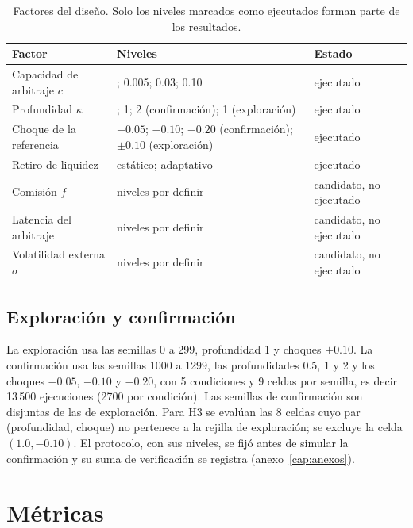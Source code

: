 \begin{table}[htbp]
\centering
\caption{Factores del diseño. Solo los niveles marcados como ejecutados forman parte de los resultados.}
\label{tab:factores}
\small
\begin{tabularx}{\textwidth}{@{}l >{\raggedright\arraybackslash}X l@{}}
\toprule
Factor & Niveles & Estado \\
\midrule
Capacidad de arbitraje $c$ & 0; 0.005; 0.03; 0.10 & ejecutado \\
Profundidad $\kappa$ & 0.5; 1; 2 (confirmación); 1 (exploración) & ejecutado \\
Choque de la referencia & $-0.05$; $-0.10$; $-0.20$ (confirmación); $\pm0.10$ (exploración) & ejecutado \\
Retiro de liquidez & estático; adaptativo & ejecutado \\
Comisión $f$ & niveles por definir & candidato, no ejecutado \\
Latencia del arbitraje & niveles por definir & candidato, no ejecutado \\
Volatilidad externa $\sigma$ & niveles por definir & candidato, no ejecutado \\
\bottomrule
\end{tabularx}
\end{table}

\subsection{Exploración y confirmación}

La exploración usa las semillas 0 a 299, profundidad 1 y choques $\pm0.10$. La confirmación usa las semillas 1000 a 1299, las profundidades 0.5, 1 y 2 y los choques $-0.05$, $-0.10$ y $-0.20$, con 5 condiciones y 9 celdas por semilla, es decir 13\,500 ejecuciones (2700 por condición). Las semillas de confirmación son disjuntas de las de exploración. Para H3 se evalúan las 8 celdas cuyo par (profundidad, choque) no pertenece a la rejilla de exploración; se excluye la celda $(1.0,-0.10)$. El protocolo, con sus niveles, se fijó antes de simular la confirmación y su suma de verificación se registra (anexo~\ref{cap:anexos}).

\section{Métricas}

